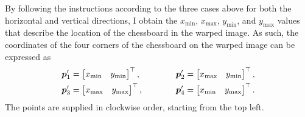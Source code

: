 \documentclass[../report.tex]{subfiles}
\begin{document}
By following the instructions according to the three cases above for both the horizontal and vertical directions, I obtain the
$x_\text{min}$,
$x_\text{max}$,
$y_\text{min}$, and
$y_\text{max}$
values that describe the location of the chessboard in the warped image. 
As such, the coordinates of the four corners of the chessboard on the warped image can be expressed as
\begin{equation*}
    \begin{split}
        {\bm{p}}'_1 &= \begin{bmatrix}
            x_\text{min} & y_\text{min}
        \end{bmatrix}^\top, \\
        {\bm{p}}'_3 &= \begin{bmatrix}
            x_\text{max} & y_\text{max}
        \end{bmatrix}^\top,
    \end{split}
    \qquad\qquad
    \begin{split}
        {\bm{p}}'_2 &= \begin{bmatrix}
            x_\text{max} & y_\text{min}
        \end{bmatrix}^\top, \\
        {\bm{p}}'_4 &= \begin{bmatrix}
            x_\text{min} & y_\text{max}
        \end{bmatrix}^\top.
    \end{split}
\end{equation*}
The points are supplied in clockwise order, starting from the top left.
\end{document}
